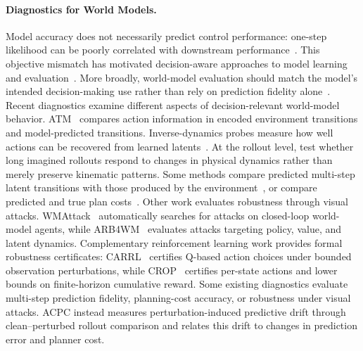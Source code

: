 \paragraph{Diagnostics for World Models.}
Model accuracy does not necessarily predict control performance:
one-step likelihood can be poorly correlated with downstream
performance~\citep{lambert2020objective}.
This objective mismatch has motivated decision-aware approaches to model
learning and evaluation~\citep{wei2024objectivemismatch}.
More broadly, world-model evaluation should match the model's intended
decision-making use rather than rely on prediction fidelity
alone~\citep{yu2026worldmodelevaluation}.
Recent diagnostics examine different aspects of decision-relevant world-model
behavior. ATM~\citep{chen2026atm} compares action information in encoded
environment transitions and model-predicted transitions. Inverse-dynamics
probes measure how well actions can be recovered from learned
latents~\citep{yeom2026actionrelevant}. At the rollout level,
\citet{schaefer2026kinematic} test whether long imagined rollouts respond to
changes in physical dynamics rather than merely preserve kinematic patterns.
Some methods compare predicted multi-step latent transitions with those
produced by the environment~\citep{vakalis2026operator}, or compare predicted
and true plan costs~\citep{you2026controlpredictability}.
Other work evaluates robustness through visual attacks.
\mbox{WMAttack}~\citep{guo2026wmattack} automatically searches for attacks on
closed-loop world-model agents, while ARB4WM~\citep{zhang2026arb4wm} evaluates
attacks targeting policy, value, and latent dynamics.
Complementary reinforcement learning work provides formal robustness certificates:
CARRL~\citep{lutjens2020certifiedrl} certifies Q-based action choices under
bounded observation perturbations, while CROP~\citep{wu2022crop} certifies
per-state actions and lower bounds on finite-horizon cumulative reward.
Some existing diagnostics evaluate multi-step prediction fidelity, planning-cost accuracy, or robustness under visual attacks. ACPC instead measures perturbation-induced predictive drift through clean--perturbed rollout comparison and relates this drift to changes in prediction error and planner cost.



